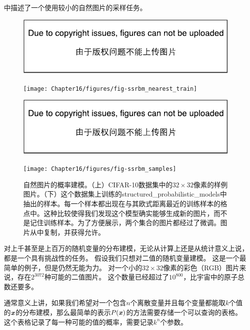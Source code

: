 中描述了一个使用较小的自然图片的采样任务。

\begin{figure}[!htb]
\ifOpenSource
\centerline{\includegraphics{figure.pdf}}
\else
	\centerline{\texttt{[image: Chapter16/figures/fig-ssrbm\_nearest\_train]}}
\fi
\ifOpenSource
\centerline{\includegraphics{figure.pdf}}
\else
	\centerline{\texttt{[image: Chapter16/figures/fig-ssrbm\_samples]}}	
\fi
	\caption{自然图片的概率建模。（上）CIFAR-10数据集\citep{KrizhevskyHinton2009}中的$32\times 32$像素的样例图片。（下）这个数据集上训练的\gls{structured_probabilistic_models}中抽出的样本。每一个样本都出现在与其欧式距离最近的训练样本的格点中。这种比较使得我们发现这个模型确实能够生成新的图片，而不是记住训练样本。为了方便展示，两个集合的图片都经过了微调。图片从\citet{Courville+al-2011-small}中复制，并获得允许。}
	\label{fig:chap16_fig-ssrbm}
\end{figure}

对上千甚至是上百万的随机变量的分布建模，无论从计算上还是从统计意义上说，都是一个具有挑战性的任务。
假设我们只想对二值的随机变量建模。
这是一个最简单的例子，但是仍然无能为力。
对一个小的$32\times 32$像素的彩色（RGB）图片来说，存在$2^{3072}$种可能的二值图片。
这个数量已经超过了$10^{800}$，比宇宙中的原子总数还要多。

通常意义上讲，如果我们希望对一个包含$n$个离散变量并且每个变量都能取$k$个值的$\boldsymbol{\mathit{x}}$的分布建模，那么最简单的表示$P(\boldsymbol{\mathit{x}})$的方法需要存储一个可以查询的表格。
这个表格记录了每一种可能的值的概率，需要记录$k^n$个参数。

